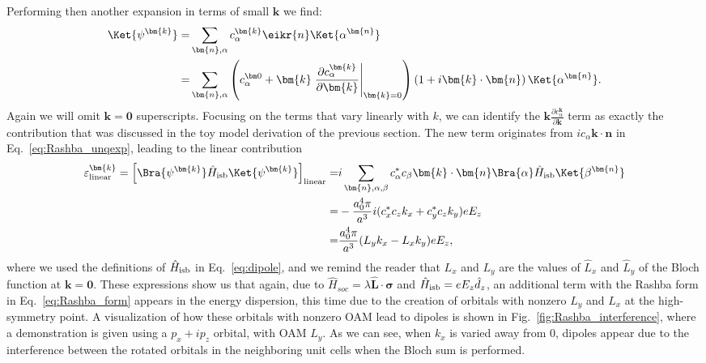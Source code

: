 Performing then another expansion in terms of small $\bm k$ we find:
\begin{align}
	\Ket{\psi^{\bm{k}}} =& \sum_{\bm{n},\alpha} c_\alpha^{\bm{k}} \eikr{n} \Ket{\alpha^{\bm{n}}}\\
	=& \sum_{\bm{n},\alpha} \left(c_\alpha^{\bm 0} + \bm{k}\left.\frac{\partial c_\alpha^{\bm{k}}}{\partial \bm{k}}\right\rvert_{\bm{k}=0} \right)\left(1 + i\bm{k}\cdot\bm{n}\right)\Ket{\alpha^{\bm{n}}}\label{eq:Rashba_unqexp}.
\end{align}
Again we will omit $\bm{k}=\bm 0$ superscripts.
Focusing on the terms that vary linearly with $k$, we can identify the $\bm k \frac{\partial c_\alpha^{\bm k}}{\partial \bm k}$ term as exactly the contribution that was discussed in the toy model derivation of the previous section.
The new term originates from $ic_\alpha \bm k \cdot \bm n$ in Eq.~\eqref{eq:Rashba_unqexp}, leading to the linear contribution
\begin{align}
	\label{eq:d_z_from_OAM}
	\varepsilon^{\bm{k}}_{\rm linear} = \left[\Bra{\psi^{\bm{k}}} \hat{H}_{\rm isb} \Ket{\psi^{\bm{k}}}\right]_{\rm linear} =&  i\sum_{\bm{n},\alpha,\beta} c_\alpha^* c_\beta \bm{k}\cdot\bm{n}\Bra{\alpha} \hat{H}_{\rm isb} \Ket{\beta^{\bm{n}}}\\
	=&-\frac{a_0^4 \pi}{a^3}i(c^*_xc_zk_x + c^*_yc_z k_y) e E_z  \\
	=&\frac{a_0^4 \pi}{a^3}(L_y k_x - L_x k_y) e E_z,
\end{align}
where we used the definitions of $\hat{H}_{\rm isb}$ in Eq.~\eqref{eq:dipole}, and we remind the reader that $L_x$ and $L_y$ are the values of $\hat{L}_x$ and $\hat{L}_y$ of the Bloch function at $\bm k = \bm 0$.
These expressions show us that again, due to ${\hat{H}_{soc} = \lambda \hat{\bm{L}}\cdot\hat{\bm{\sigma}}}$ and $\hat{H}_{\rm isb} = e E_z \hat{d}_z$, an additional term with the Rashba form in Eq.~\eqref{eq:Rashba_form} appears in the energy dispersion, this time due to the creation of orbitals with nonzero $L_y$ and $L_x$ at the high-symmetry point.
A visualization of how these orbitals with nonzero OAM lead to dipoles is shown in Fig.~\ref{fig:Rashba_interference}, where a demonstration is given using a $p_x + i p_z$ orbital, with OAM $L_y$.
As we can see, when $k_x$ is varied away from 0, dipoles appear due to the interference between the rotated orbitals in the neighboring unit cells when the Bloch sum is performed.
